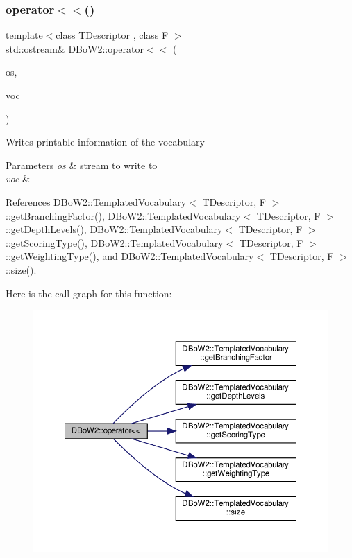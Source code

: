 \subsubsection{\texorpdfstring{operator$<$$<$()}{operator<<()}\hspace{0.1cm}{\footnotesize\ttfamily [4/4]}}
{\footnotesize\ttfamily template$<$class T\+Descriptor , class F $>$ \\
std\+::ostream\& D\+Bo\+W2\+::operator$<$$<$ (\begin{DoxyParamCaption}\item[{std\+::ostream \&}]{os,  }\item[{const \hyperlink{classDBoW2_1_1TemplatedVocabulary}{Templated\+Vocabulary}$<$ T\+Descriptor, F $>$ \&}]{voc }\end{DoxyParamCaption})}

Writes printable information of the vocabulary 
\begin{DoxyParams}{Parameters}
{\em os} & stream to write to \\
\hline
{\em voc} & \\
\hline
\end{DoxyParams}


References D\+Bo\+W2\+::\+Templated\+Vocabulary$<$ T\+Descriptor, F $>$\+::get\+Branching\+Factor(), D\+Bo\+W2\+::\+Templated\+Vocabulary$<$ T\+Descriptor, F $>$\+::get\+Depth\+Levels(), D\+Bo\+W2\+::\+Templated\+Vocabulary$<$ T\+Descriptor, F $>$\+::get\+Scoring\+Type(), D\+Bo\+W2\+::\+Templated\+Vocabulary$<$ T\+Descriptor, F $>$\+::get\+Weighting\+Type(), and D\+Bo\+W2\+::\+Templated\+Vocabulary$<$ T\+Descriptor, F $>$\+::size().

Here is the call graph for this function\+:\nopagebreak
\begin{figure}[H]
\begin{center}
\leavevmode
\includegraphics[width=350pt]{namespaceDBoW2_aecdf616fe16d2cf09f521a603b9d43f1_cgraph}
\end{center}
\end{figure}
